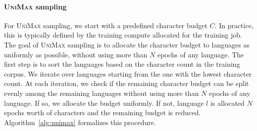 \documentclass{article} %
\newcommand{\unimax}{\textsc{UniMax}}
\begin{document}
\begin{table}[]
\caption{Language sampling temperatures of recent multilingual LLMs trained on unlabeled data.}
\label{table:temperature_literature}
\begin{center}
\end{center}
\end{table}

\paragraph{\unimax{} sampling}

For \unimax{} sampling, we start with a predefined character budget $C$. In practice, this is typically defined by the training compute allocated for the training job. The goal of \unimax{} sampling is to allocate the character budget to languages as uniformly as possible, without using more than $N$ epochs of any language. The first step is to sort the languages based on the character count in the training corpus. We iterate over languages starting from the one with the lowest character count. At each iteration, we check if the remaining character budget can be split evenly among the remaining languages without using more than $N$ epochs of any language. If so, we allocate the budget uniformly. If not, language $l$ is allocated $N$ epochs worth of characters and the remaining budget is reduced. Algorithm~\ref{alg:unimax} formalizes this procedure.
\end{document}
